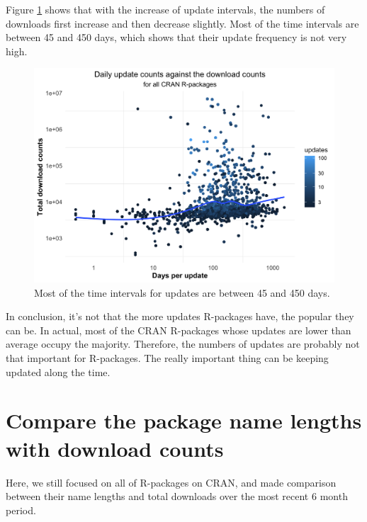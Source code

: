 \documentclass[
]{book}
\begin{document}
Figure \ref{fig:updates-perday} shows that with the increase of update intervals, the numbers of downloads first increase and then decrease slightly. Most of the time intervals are between 45 and 450 days, which shows that their update frequency is not very high.



\begin{figure}

{\centering \includegraphics{figures/updates-perday-1} 

}

\caption{Most of the time intervals for updates are between 45 and 450 days.}\label{fig:updates-perday}
\end{figure}

In conclusion, it's not that the more updates R-packages have, the popular they can be. In actual, most of the CRAN R-packages whose updates are lower than average occupy the majority. Therefore, the numbers of updates are probably not that important for R-packages. The really important thing can be keeping updated along the time.

\hypertarget{compare-the-package-name-lengths-with-download-counts}{%
\section{Compare the package name lengths with download counts}\label{compare-the-package-name-lengths-with-download-counts}}

Here, we still focused on all of R-packages on CRAN, and made comparison between their name lengths and total downloads over the most recent 6 month period.
\end{document}
